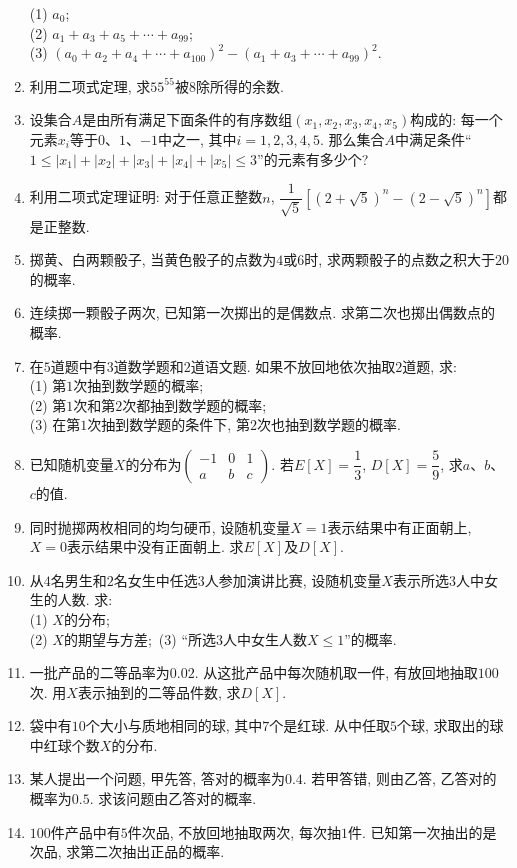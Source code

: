 \documentclass[10pt,a4paper]{article}
\begin{document}
\begin{enumerate}[1.]
(1) $a_0$;\\
(2) $a_1+a_3+a_5+\cdots+a_{99}$;\\
(3) $(a_0+a_2+a_4+\cdots+a_{100})^2-(a_1+a_3+\cdots+a_{99})^2$. \item 利用二项式定理, 求$55^{55}$被$8$除所得的余数.
\item 设集合$A$是由所有满足下面条件的有序数组$(x_1,x_2,x_3,x_4,x_5)$构成的: 每一个元素$x_i$等于$0$、$1$、$-1$中之一, 其中$i=1,2,3,4,5$. 那么集合$A$中满足条件``$1\le |x_1|+|x_2|+|x_3|+|x_4|+|x_5|\le 3$''的元素有多少个?
\item 利用二项式定理证明: 对于任意正整数$n$, $\dfrac1{\sqrt 5}[(2+\sqrt 5)^n-(2-\sqrt 5)^n]$都是正整数. 

\item 掷黄、白两颗骰子, 当黄色骰子的点数为$4$或$6$时, 求两颗骰子的点数之积大于$20$的概率.
\item 连续掷一颗骰子两次, 已知第一次掷出的是偶数点. 求第二次也掷出偶数点的
概率. 
\item 在$5$道题中有$3$道数学题和$2$道语文题. 如果不放回地依次抽取$2$道题, 求:\\
(1) 第$1$次抽到数学题的概率;\\
(2) 第$1$次和第$2$次都抽到数学题的概率;\\
(3) 在第$1$次抽到数学题的条件下, 第$2$次也抽到数学题的概率.
\item 已知随机变量$X$的分布为$\begin{pmatrix} -1 & 0 & 1 \\ a & b & c\end{pmatrix}$. 若$E[X]=\dfrac 13$, $D[X]=\dfrac 59$, 求$a$、$b$、$c$的值.
\item 同时抛掷两枚相同的均匀硬币, 设随机变量$X=1$表示结果中有正面朝上, $X=0$表示结果中没有正面朝上. 求$E[X]$及$D[X]$.
\item 从$4$名男生和$2$名女生中任选$3$人参加演讲比赛, 设随机变量$X$表示所选$3$人中女生的人数. 求:\\
(1) $X$的分布;\\
(2) $X$的期望与方差;\
(3) ``所选$3$人中女生人数$X\le 1$''的概率.
\item 一批产品的二等品率为$0.02$. 从这批产品中每次随机取一件, 有放回地抽取$100$次. 用$X$表示抽到的二等品件数, 求$D[X]$.
\item 袋中有$10$个大小与质地相同的球, 其中$7$个是红球. 从中任取$5$个球, 求取出的球中红球个数$X$的分布.
\item 某人提出一个问题, 甲先答, 答对的概率为$0.4$. 若甲答错, 则由乙答, 乙答对的概率为$0.5$. 求该问题由乙答对的概率.
\item $100$件产品中有$5$件次品, 不放回地抽取两次, 每次抽$1$件. 已知第一次抽出的是次品, 求第二次抽出正品的概率.

\end{enumerate}
\end{document}
